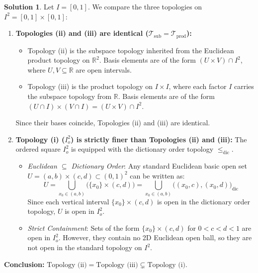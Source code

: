 \documentclass[11pt, a4paper]{article}
\theoremstyle{definition}
\newtheorem*{solution}{Solution}
\begin{document}
\begin{solution}
Let $I = [0,1]$. We compare the three topologies on $I^2 = [0,1] \times [0,1]$:

\begin{enumerate}[label=\arabic*.]
    \item \textbf{Topologies (ii) and (iii) are identical ($\mathcal{T}_{\text{sub}} = \mathcal{T}_{\text{prod}}$):}
    \begin{itemize}
        \item Topology (ii) is the subspace topology inherited from the Euclidean product topology on $\mathbb{R}^2$. Basis elements are of the form $(U \times V) \cap I^2$, where $U, V \subseteq \mathbb{R}$ are open intervals.
        \item Topology (iii) is the product topology on $I \times I$, where each factor $I$ carries the subspace topology from $\mathbb{R}$. Basis elements are of the form $(U \cap I) \times (V \cap I) = (U \times V) \cap I^2$.
    \end{itemize}
    Since their bases coincide, Topologies (ii) and (iii) are identical.

    \item \textbf{Topology (i) ($I_o^2$) is strictly finer than Topologies (ii) and (iii):}
    The ordered square $I_o^2$ is equipped with the dictionary order topology $\le_{\text{dic}}$.
    \begin{itemize}
        \item \emph{Euclidean $\subseteq$ Dictionary Order}: Any standard Euclidean basic open set $U = (a,b) \times (c,d) \subset (0,1)^2$ can be written as:
        \[
        U = \bigcup_{x_0 \in (a, b)} \Big( \{x_0\} \times (c, d) \Big) = \bigcup_{x_0 \in (a, b)} \Big( (x_0, c), (x_0, d) \Big)_{\text{dic}}
        \]
        Since each vertical interval $\{x_0\} \times (c,d)$ is open in the dictionary order topology, $U$ is open in $I_o^2$.
        \item \emph{Strict Containment}: Sets of the form $\{x_0\} \times (c,d)$ for $0 < c < d < 1$ are open in $I_o^2$. However, they contain no 2D Euclidean open ball, so they are not open in the standard topology on $I^2$.
    \end{itemize}
\end{enumerate}
\textbf{Conclusion:} $\text{Topology (ii)} = \text{Topology (iii)} \subsetneq \text{Topology (i)}$.
\end{solution}

\vspace{1em}
\end{document}
